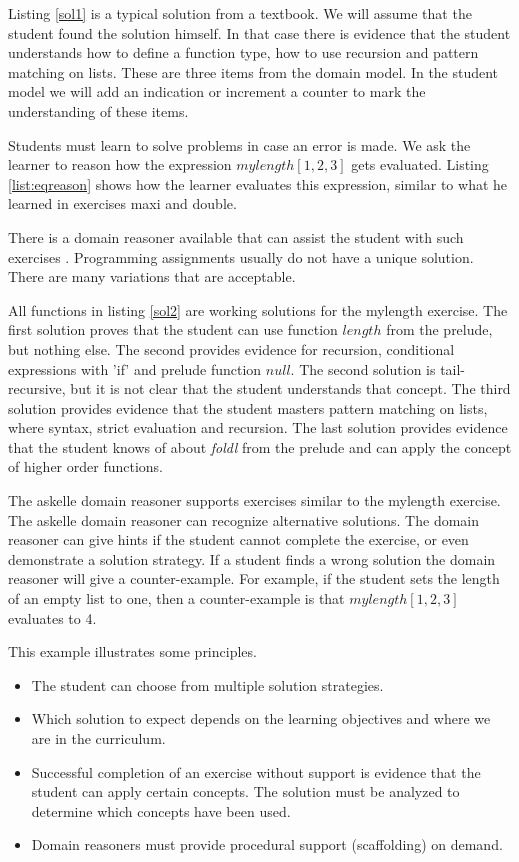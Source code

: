 

Listing \ref{sol1} is a typical solution from a textbook.
We will assume that the student found the solution himself.
In that case there is evidence that the student understands how to define a function type, how to use recursion and pattern matching on lists.
These are three items from the domain model. In the student model we will add an indication or increment a counter to mark the understanding of these items.


Students must learn to solve problems in case an error is made.
We ask the learner to reason how the expression $\mathit{mylength [1,2,3]}$ gets evaluated.
Listing \ref{list:eqreason} shows how the learner evaluates this expression, similar to what he learned in exercises maxi and double.



There is a domain reasoner available that can assist the student with such exercises  \citep{tutorHEE}. 
Programming assignments usually do not  have a unique solution. 
There are many variations that are acceptable.



All functions in listing \ref{sol2} are working solutions for the mylength exercise.
The first solution proves that the student can use function $\mathit{length}$ from the prelude, but nothing else.
The second provides evidence for recursion,  conditional expressions with 'if' and prelude function $\mathit{null}$.
The second solution is tail-recursive, but it is not clear that the student understands that concept.
The third solution provides evidence that the student masters pattern matching on lists, where syntax,  strict evaluation and recursion.
The last solution provides evidence that the student knows of about \textit{foldl} from the prelude and can apply the concept of higher order functions.

The \gls{askelle} domain reasoner \citep{Gerdes2017} supports exercises similar to the mylength exercise.
The \gls{askelle} domain reasoner can recognize alternative solutions.
The domain reasoner can give hints if the student cannot complete the exercise, or even demonstrate a solution strategy.
If a student finds a wrong solution the domain reasoner will give a counter-example.
For example, if the student sets the length of an empty list to one, then a counter-example is that $\mathit{mylength [1,2,3]}$ evaluates to 4.
 

This example illustrates some principles.
\begin{itemize}
\item The student can choose from multiple solution strategies.
\item Which solution to expect depends on the learning objectives and where we are in the curriculum.
\item Successful completion of an exercise without support is evidence that the student can apply certain concepts.
The solution must be analyzed to determine which concepts have been used.
\item Domain reasoners must provide procedural support (scaffolding) on demand.
\end{itemize}

